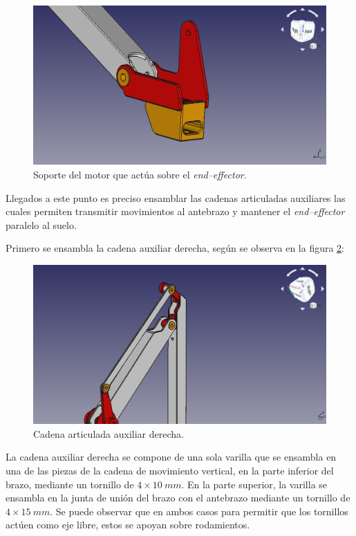 \begin{figure}[H]
    \centering 
    \includegraphics[width=1\linewidth]{pictures/SujecionMotorFinal.png}
    \caption{Soporte del motor que actúa sobre el \textit{end--effector}.}
    \label{fig:soporte_motor}
\end{figure}

Llegados a este punto es preciso ensamblar las cadenas articuladas auxiliares las cuales permiten transmitir movimientos al antebrazo y mantener el \textit{end--effector} paralelo al suelo.

Primero se ensambla la cadena auxiliar derecha, según se observa en la figura \ref{fig:auxiliar_derecha}:
\begin{figure}[H]
    \centering 
    \includegraphics[width=1\linewidth]{pictures/CadenaArticuladaDerecha.png}
    \caption{Cadena articulada auxiliar derecha.}
    \label{fig:auxiliar_derecha}
\end{figure}

La cadena auxiliar derecha se compone de una sola varilla que se ensambla en una de las piezas de la cadena de movimiento vertical, en la parte inferior del brazo, mediante un tornillo de $4 \times 10~mm$. En la parte superior, la varilla se ensambla en la junta de unión del brazo con el antebrazo mediante un tornillo de $4 \times 15~mm$. Se puede observar que en ambos casos para permitir que los tornillos actúen como eje libre, estos se apoyan sobre rodamientos.

